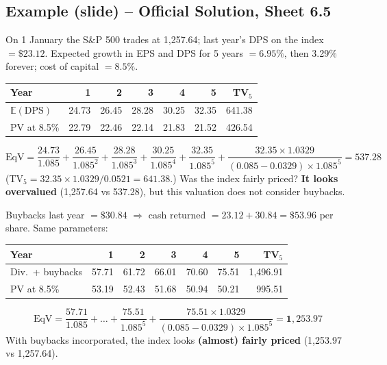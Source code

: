 \subsection{Example (slide) -- Official Solution, Sheet 6.5}
\begin{exbox}
On 1 January the S\&P 500 trades at 1,257.64; last year's DPS on the index $=\$23.12$. Expected growth in EPS and DPS for 5 years $=6.95\%$, then 3.29\% forever; cost of capital $=8.5\%$.
\begin{center}
\small
\begin{tabular}{@{}lrrrrr|r@{}}
\toprule
Year & 1 & 2 & 3 & 4 & 5 & TV$_5$\\
\midrule
$\mathbb{E}(\text{DPS})$ & 24.73 & 26.45 & 28.28 & 30.25 & 32.35 & 641.38\\
PV at 8.5\% & 22.79 & 22.46 & 22.14 & 21.83 & 21.52 & 426.54\\
\bottomrule
\end{tabular}
\end{center}
\[
\text{EqV}=\frac{24.73}{1.085}+\frac{26.45}{1.085^2}+\frac{28.28}{1.085^3}+\frac{30.25}{1.085^4}+\frac{32.35}{1.085^5}+\frac{32.35\times1.0329}{(0.085-0.0329)\times1.085^5}=\mathbf{537.28}
\]
(TV$_5=32.35\times1.0329/0.0521=641.38$.) Was the index fairly priced? \textbf{It looks overvalued} (1,257.64 vs 537.28), but this valuation does not consider buybacks.
\end{exbox}
\begin{exbox}
Buybacks last year $=\$30.84$ $\Rightarrow$ cash returned $=23.12+30.84=\$53.96$ per share. Same parameters:
\begin{center}
\small
\begin{tabular}{@{}lrrrrr|r@{}}
\toprule
Year & 1 & 2 & 3 & 4 & 5 & TV$_5$\\
\midrule
Div.\ + buybacks & 57.71 & 61.72 & 66.01 & 70.60 & 75.51 & 1{,}496.91\\
PV at 8.5\% & 53.19 & 52.43 & 51.68 & 50.94 & 50.21 & 995.51\\
\bottomrule
\end{tabular}
\end{center}
\[
\text{EqV}=\frac{57.71}{1.085}+\dots+\frac{75.51}{1.085^5}+\frac{75.51\times1.0329}{(0.085-0.0329)\times1.085^5}=\mathbf{1{,}253.97}
\]
With buybacks incorporated, the index looks \textbf{(almost) fairly priced} (1,253.97 vs 1,257.64).
\end{exbox}

